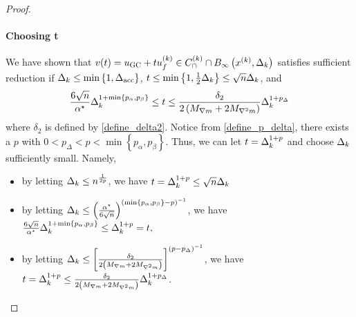 \begin{proof}
\paragraph{Choosing t}

We have shown that $v(t) = u_{\textrm{GC}} + t {u^{(k)}_f} \in {C^{(k)}_{\cap}} \cap { B_{\infty}\left(x^{(k)}, \Delta_k\right) }$ satisfies sufficient reduction 
if $\Delta_k \le \min\left\{1, {\Delta_{\textrm{acc}}}\right\}$, $t \le \min\left\{1, \frac 1 2 \Delta_k\right\} \le \sqrt{n} \Delta_k$, and
\begin{align*}
\frac{6 \sqrt{n}}{{ \alpha^{\star} }} \Delta_k^{1 + \min\left\{p_{\alpha}, p_{\beta}\right\}} \le t 
\le \frac {\delta_2}{2\left({M_{\nabla m}} + 2{M_{\nabla^2 m}}\right)} \Delta_k^{1 + p_{\Delta}}
\end{align*}
where $\delta_2$ is defined by \cref{define_delta2}.
Notice from \cref{define_p_delta}, there exists a $p$ with $0 < p_{\Delta} < p < \min\left\{p_{\alpha}, p_{\beta}\right\}$.
Thus, we can let $t = \Delta_k^{1+p}$ and choose $\Delta_k$ sufficiently small.
Namely,
\begin{itemize}
\item by letting 
$\Delta_k \le n^{\frac 1 {2p} }$, we have
$t = \Delta_k^{1+p} \le \sqrt{n} \Delta_k$
\item by letting 
$\Delta_k \le \left(\frac{{ \alpha^{\star} }}{6 \sqrt{n}}\right)^{\left(\min\left\{p_{\alpha}, p_{\beta}\right\} - p\right)^{-1}}$, we have
$\frac{6 \sqrt{n}}{{ \alpha^{\star} }} \Delta_k^{1 + \min\left\{p_{\alpha}, p_{\beta}\right\}} \le \Delta_k^{1+p} = t,$
\item by letting 
$\Delta_k \le \left[ \frac {\delta_2}{2\left({M_{\nabla m}} + 2{M_{\nabla^2 m}}\right)} \right]^{\left(p - p_{\Delta}\right)^{-1}}$, we have
$t = \Delta_k^{1+p} \le  \frac {\delta_2}{2\left({M_{\nabla m}} + 2{M_{\nabla^2 m}}\right)} \Delta_k^{1 + p_{\Delta}}$.
\end{itemize}





\end{proof}
